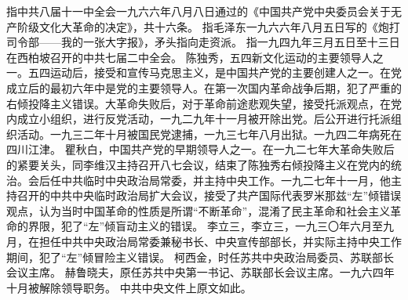 \begin{maonote}
指中共八届十一中全会一九六六年八月八日通过的《中国共产党中央委员会关于无产阶级文化大革命的决定》，共十六条。
指毛泽东一九六六年八月五日写的《炮打司令部——我的一张大字报》，矛头指向走资派。
指一九四九年三月五日至十三日在西柏坡召开的中共七届二中全会。
陈独秀，五四新文化运动的主要领导人之一。五四运动后，接受和宣传马克思主义，是中国共产党的主要创建人之一。在党成立后的最初六年中是党的主要领导人。在第一次国内革命战争后期，犯了严重的右倾投降主义错误。大革命失败后，对于革命前途悲观失望，接受托派观点，在党内成立小组织，进行反党活动，一九二九年十一月被开除出党。后公开进行托派组织活动。一九三二年十月被国民党逮捕，一九三七年八月出狱。一九四二年病死在四川江津。
瞿秋白，中国共产党的早期领导人之一。在一九二七年大革命失败后的紧要关头，同李维汉主持召开八七会议，结束了陈独秀右倾投降主义在党内的统治。会后任中共临时中央政治局常委，并主持中央工作。一九二七年十一月，他主持召开的中共中央临时政治局扩大会议，接受了共产国际代表罗米那兹“左”倾错误观点，认为当时中国革命的性质是所谓“不断革命”，混淆了民主革命和社会主义革命的界限，犯了“左”倾盲动主义的错误。
李立三，李立三，一九三〇年六月至九月，在担任中共中央政治局常委兼秘书长、中央宣传部部长，并实际主持中央工作期间，犯了“左”倾冒险主义错误。
柯西金，时任苏共中央政治局委员、苏联部长会议主席。
赫鲁晓夫，原任苏共中央第一书记、苏联部长会议主席。一九六四年十月被解除领导职务。
中共中央文件上原文如此。
\end{maonote}
